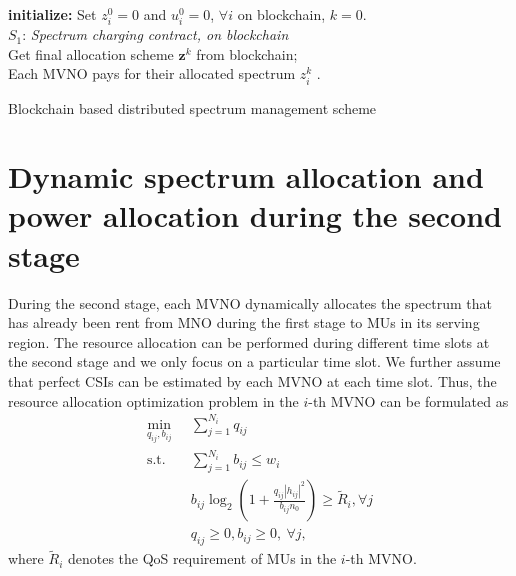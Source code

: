 \documentclass[journal]{IEEEtran}
\begin{document}
	\SetAlCapSkip{1em}
\begin{algorithm}[h]

	 \textbf{initialize:} 
	Set $z_i^0 = 0$ and $u_i^0 = 0$, $\forall i$ on blockchain, $k = 0$.\\
	 $S_1$: \textit{Spectrum charging contract, on blockchain}\\
	\Indp
		 Get final allocation scheme $  \mathbf{z}^{k} $ from blockchain;\\
		  Each MVNO pays for their allocated spectrum $ z_i^k $ .\\
	\Indm

\caption{Blockchain based distributed spectrum management scheme}
\end{algorithm}


\section{Dynamic spectrum allocation and power allocation during the second stage}
During the second stage, each MVNO dynamically allocates the spectrum that has already been rent from MNO during the first stage to MUs in its serving region. The resource allocation can be performed during different time slots at the second stage and we only focus on a particular time slot. We further assume that perfect CSIs can be estimated by each MVNO at each time slot. Thus, the resource allocation optimization problem in the $i$-th MVNO can be formulated as
\begin{subequations}\label{eq25}
	\begin{align}
	\min_{q_{ij}, b_{ij}}\ & \sum\limits_{j = 1}^{N_i} q_{ij} \label{q25a} \\ \mbox{s.t.} \quad &  \sum\limits_{j = 1}^{N_i} b_{ij} \leq w_i \label{q25b} \\ \quad &  b_{ij}\log_2\left(1 + \frac{q_{ij}\left|h_{ij}\right|^2}{b_{ij}n_0}\right) \geq \tilde{R}_i, \forall j \label{q25c}\\
	& q_{ij} \geq 0, b_{ij} \geq 0, \ \forall j, \label{q25d}
	\end{align}
\end{subequations}
where $\tilde{R}_i$ denotes the QoS requirement of MUs in the $i$-th MVNO.
\end{document}
